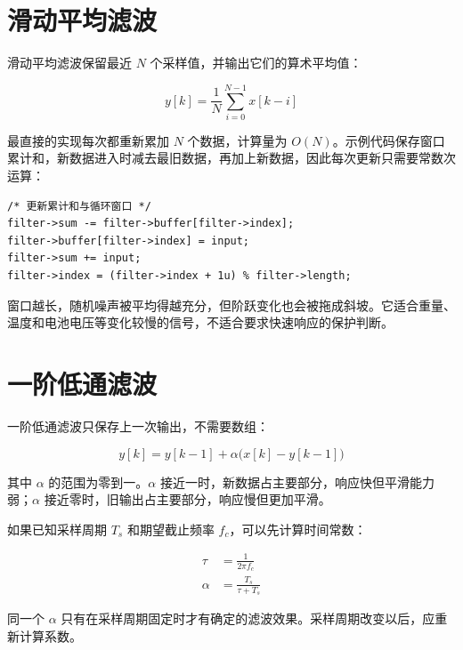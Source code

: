 \section{滑动平均滤波}

滑动平均滤波保留最近 $N$ 个采样值，并输出它们的算术平均值：

\begin{equation}
y[k]=\frac{1}{N}\sum_{i=0}^{N-1}x[k-i]
\label{eq:moving-average}
\end{equation}

最直接的实现每次都重新累加 $N$ 个数据，计算量为 $O(N)$。示例代码保存窗口累计和，新数据进入时减去最旧数据，再加上新数据，因此每次更新只需要常数次运算：

\begin{lstlisting}[style=c]
/* 更新累计和与循环窗口 */
filter->sum -= filter->buffer[filter->index];
filter->buffer[filter->index] = input;
filter->sum += input;
filter->index = (filter->index + 1u) % filter->length;
\end{lstlisting}

窗口越长，随机噪声被平均得越充分，但阶跃变化也会被拖成斜坡。它适合重量、温度和电池电压等变化较慢的信号，不适合要求快速响应的保护判断。

\section{一阶低通滤波}

一阶低通滤波只保存上一次输出，不需要数组：

\begin{equation}
y[k]=y[k-1]+\alpha\bigl(x[k]-y[k-1]\bigr)
\label{eq:first-low-pass}
\end{equation}

其中 $\alpha$ 的范围为零到一。$\alpha$ 接近一时，新数据占主要部分，响应快但平滑能力弱；$\alpha$ 接近零时，旧输出占主要部分，响应慢但更加平滑。

如果已知采样周期 $T_s$ 和期望截止频率 $f_c$，可以先计算时间常数：

\begin{align}
\tau &= \frac{1}{2\pi f_c} \\
\alpha &= \frac{T_s}{\tau+T_s}
\end{align}

同一个 $\alpha$ 只有在采样周期固定时才有确定的滤波效果。采样周期改变以后，应重新计算系数。

